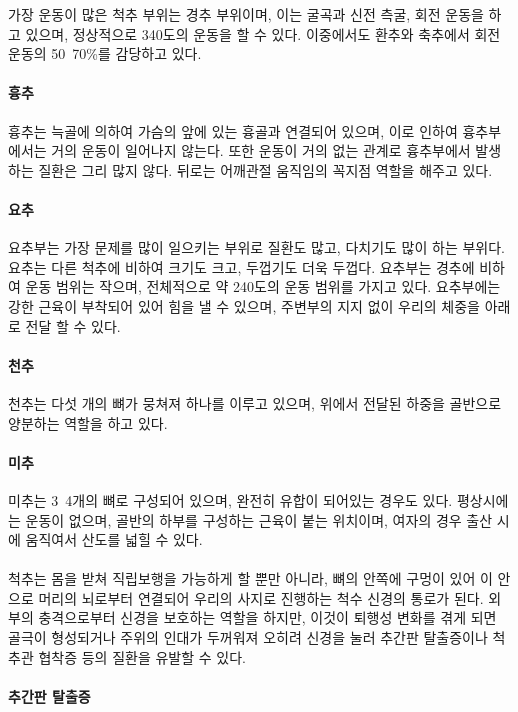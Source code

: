 \documentclass[12pt, a4paper, oneside]{book}
\begin{document}
가장 운동이 많은 척추 부위는 경추 부위이며, 이는 굴곡과 신전 측굴, 회전 운동을 하고 있으며, 정상적으로 340도의 운동을 할 수 있다. 이중에서도 환추와 축추에서 회전 운동의 50~70\%를 감당하고 있다. 

\paragraph{흉추}
흉추는 늑골에 의하여 가슴의 앞에 있는 흉골과 연결되어 있으며, 이로 인하여 흉추부에서는 거의 운동이 일어나지 않는다. 또한 운동이 거의 없는 관계로 흉추부에서 발생하는 질환은 그리 많지 않다. 뒤로는 어깨관절 움직임의 꼭지점 역할을 해주고 있다. 

\paragraph{요추}
요추부는 가장 문제를 많이 일으키는 부위로 질환도 많고, 다치기도 많이 하는 부위다. 요추는 다른 척추에 비하여 크기도 크고, 두껍기도 더욱 두껍다. 요추부는 경추에 비하여 운동 범위는 작으며, 전체적으로 약 240도의 운동 범위를 가지고 있다. 요추부에는 강한 근육이 부착되어 있어 힘을 낼 수 있으며, 주변부의 지지 없이 우리의 체중을 아래로 전달 할 수 있다. 

\paragraph{천추}
천추는 다섯 개의 뼈가 뭉쳐져 하나를 이루고 있으며, 위에서 전달된 하중을 골반으로 양분하는 역할을 하고 있다. 

\paragraph{미추}
미추는 3~4개의 뼈로 구성되어 있으며, 완전히 유합이 되어있는 경우도 있다. 평상시에는 운동이 없으며, 골반의 하부를 구성하는 근육이 붙는 위치이며, 여자의 경우 출산 시에 움직여서 산도를 넓힐 수 있다. 

\paragraph{}
척추는 몸을 받쳐 직립보행을 가능하게 할 뿐만 아니라, 뼈의 안쪽에 구멍이 있어 이 안으로 머리의 뇌로부터 연결되어 우리의 사지로 진행하는 척수 신경의 통로가 된다. 
외부의 충격으로부터 신경을 보호하는 역할을 하지만, 이것이 퇴행성 변화를 겪게 되면 골극이 형성되거나 주위의 인대가 두꺼워져 오히려 신경을 눌러 추간판 탈출증이나 척추관 협착증 등의 질환을 유발할 수 있다.	

\paragraph{추간판 탈출증}
\end{document}
